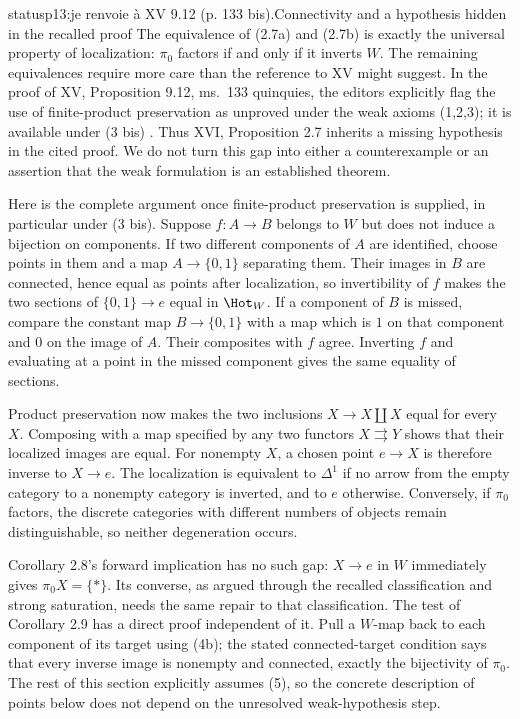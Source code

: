 \begin{dcomment}{status}{p13:je renvoie à XV 9.12 (p. 133 bis).}{Connectivity and a hypothesis hidden in the recalled proof}
The equivalence of (2.7a) and (2.7b) is exactly the universal property of localization: $\pi_0$ factors if and only if it inverts $W$. The remaining equivalences require more care than the reference to XV might suggest. In the proof of XV, Proposition 9.12, ms.~133 quinquies, the editors explicitly flag the use of finite-product preservation as unproved under the weak axioms (1,2,3); it is available under (3 bis) \citep{Grothendieck1990XV}. Thus XVI, Proposition 2.7 inherits a missing hypothesis in the cited proof. We do not turn this gap into either a counterexample or an assertion that the weak formulation is an established theorem.

Here is the complete argument once finite-product preservation is supplied, in particular under (3 bis). Suppose $f:A\to B$ belongs to $W$ but does not induce a bijection on components. If two different components of $A$ are identified, choose points in them and a map $A\to\{0,1\}$ separating them. Their images in $B$ are connected, hence equal as points after localization, so invertibility of $f$ makes the two sections of $\{0,1\}\to e$ equal in $\Hot_W$. If a component of $B$ is missed, compare the constant map $B\to\{0,1\}$ with a map which is $1$ on that component and $0$ on the image of $A$. Their composites with $f$ agree. Inverting $f$ and evaluating at a point in the missed component gives the same equality of sections.

Product preservation now makes the two inclusions $X\to X\amalg X$ equal for every $X$. Composing with a map specified by any two functors $X\rightrightarrows Y$ shows that their localized images are equal. For nonempty $X$, a chosen point $e\to X$ is therefore inverse to $X\to e$. The localization is equivalent to $\Delta^1$ if no arrow from the empty category to a nonempty category is inverted, and to $e$ otherwise. Conversely, if $\pi_0$ factors, the discrete categories with different numbers of objects remain distinguishable, so neither degeneration occurs.

Corollary 2.8's forward implication has no such gap: $X\to e$ in $W$ immediately gives $\pi_0X=\{*\}$. Its converse, as argued through the recalled classification and strong saturation, needs the same repair to that classification. The test of Corollary 2.9 has a direct proof independent of it. Pull a $W$-map back to each component of its target using (4b); the stated connected-target condition says that every inverse image is nonempty and connected, exactly the bijectivity of $\pi_0$. The rest of this section explicitly assumes (5), so the concrete description of points below does not depend on the unresolved weak-hypothesis step.
\end{dcomment}

